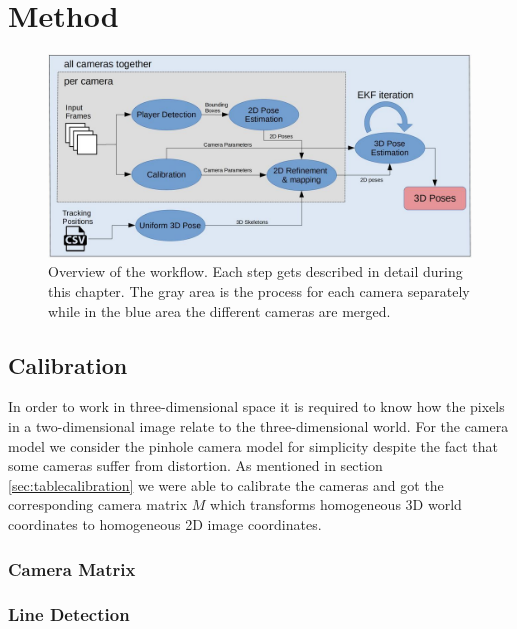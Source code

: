 \chapter{Method}\label{chap:method}
\begin{figure}[h]
	\centering
	\includegraphics[width=1.0\textwidth]{./images/overview.jpg}
	\caption{Overview of the workflow. Each step gets described in detail during this chapter. The gray area is the process for each camera separately while in the blue area the different cameras are merged.}
	\label{fig:overview}
\end{figure}

\section{Calibration}\label{sec:calibration}

In order to work in three-dimensional space it is required to know how the pixels in a two-dimensional image relate to the three-dimensional world. For the camera model we consider the pinhole camera model for simplicity despite the fact that some cameras suffer from distortion. As mentioned in section \ref{sec:tablecalibration} we were able to calibrate the cameras and got the corresponding camera matrix $M$ which transforms homogeneous 3D world coordinates to homogeneous 2D image coordinates. 

\subsection{Camera Matrix}\label{sec:cameramatrix}

\subsection{Line Detection}

